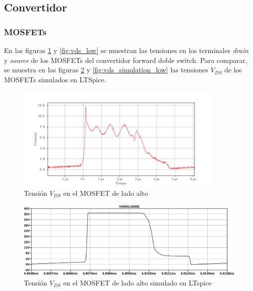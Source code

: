 




\subsection{Convertidor}

\subsubsection{MOSFETs}



En las figuras \ref{fig:vds_high} y \ref{fig:vds_low} se muestran las tensiones en los terminales \textit{drain} y \textit{source} de los MOSFETs del convertidor forward doble switch.
Para comparar, se muestra en las figuras \ref{fig:vds_simulation_high} y \ref{fig:vds_simulation_low} las tensiones $V_{DS}$ de los MOSFETs simulados en LTSpice. 

\begin{figure}[H]
    \centering
    \includegraphics[width=0.9\textwidth]{images/capturas-osciloscopio/17-11-2022/33.png}
    \caption{Tensión $V_{DS}$ en el MOSFET de lado alto}
    \label{fig:vds_high}
\end{figure}

\begin{figure}[H]
    \centering
    \includegraphics[width=\textwidth]{images/sim/16.pdf}
    \caption{Tensión $V_{DS}$ en el MOSFET de lado alto simulado en LTspice}
    \label{fig:vds_simulation_high}
\end{figure}


